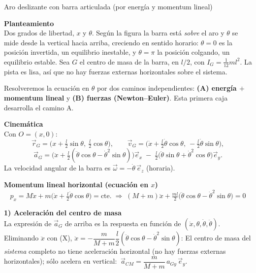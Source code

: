 \begin{solucion}{Aro deslizante con barra articulada (por energía y momentum lineal)}

\textbf{Planteamiento}\\
Dos grados de libertad, $x$ y $\theta$. Según la figura la barra está \emph{sobre} el aro y $\theta$ se mide desde la vertical hacia arriba, creciendo en sentido horario: $\theta=0$ es la posición invertida, un equilibrio inestable, y $\theta=\pi$ la posición colgando, un equilibrio estable. Sea $G$ el centro de masa de la barra, en $l/2$, con $I_G = \tfrac{1}{12}ml^2$. La pista es lisa, así que no hay fuerzas externas horizontales sobre el sistema.


Resolveremos la ecuación en $\theta$ por dos caminos independientes: \textbf{(A) energía $+$ momentum lineal} y \textbf{(B) fuerzas (Newton--Euler)}. Esta primera caja desarrolla el camino A.

\textbf{Cinemática}\\
Con $O=(x,0)$:
\[
\vec{r}_G = \Big(x+\tfrac l2\sin\theta,\ \tfrac l2\cos\theta\Big),\qquad
\vec{v}_G = \Big(\dot x + \tfrac l2\dot\theta\cos\theta,\ -\tfrac l2\dot\theta\sin\theta\Big),
\]
\[
\vec{a}_G = \Big(\ddot x + \tfrac l2(\ddot\theta\cos\theta - \dot\theta^2\sin\theta)\Big)\vec{e}_x
\;-\;\tfrac l2\big(\ddot\theta\sin\theta + \dot\theta^2\cos\theta\big)\vec{e}_y .
\]
La velocidad angular de la barra es $\vec{\omega} = -\dot\theta\,\vec{e}_z$ (horaria).

\textbf{Momentum lineal horizontal (ecuación en $x$)}\\
\begin{equation*}
p_x = M\dot x + m\big(\dot x + \tfrac l2\dot\theta\cos\theta\big) = \text{cte.}
\;\Rightarrow\;
(M+m)\ddot x + \tfrac{ml}{2}\big(\ddot\theta\cos\theta - \dot\theta^2\sin\theta\big) = 0
\tag{X}
\end{equation*}

\textbf{1) Aceleración del centro de masa}\\
La expresión de $\vec{a}_G$ de arriba es la respuesta en función de $(\ddot x,\theta,\dot\theta,\ddot\theta)$. Eliminando $\ddot x$ con (X), $\ddot x = -\dfrac{m}{M+m}\dfrac l2(\ddot\theta\cos\theta-\dot\theta^2\sin\theta)$:
El centro de masa del \emph{sistema} completo no tiene aceleración horizontal (no hay fuerzas externas horizontales); sólo acelera en vertical:
$\ \vec{a}_{CM}=\dfrac{m}{M+m}\,a_{Gy}\,\vec{e}_y$.


\end{solucion}
